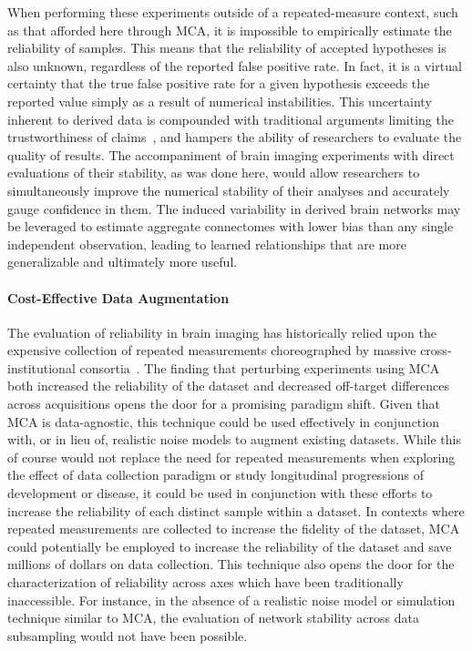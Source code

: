 \documentclass[fleqn,10pt]{SelfArx} %
\begin{document}
When performing these experiments outside of a repeated-measure context, such as that afforded here through MCA, it is
impossible to empirically estimate the reliability of samples. This means that the reliability of accepted hypotheses
is also unknown, regardless of the reported false positive rate. In fact, it is a virtual certainty that the true false
positive rate for a given hypothesis exceeds the reported value simply as a result of numerical instabilities. This
uncertainty inherent to derived data is compounded with traditional arguments limiting the trustworthiness of
claims~\cite{ioannidis2005most}, and hampers the ability of researchers to evaluate the quality of results. The
accompaniment of brain imaging experiments with direct evaluations of their stability, as was done here, would allow
researchers to simultaneously improve the numerical stability of their analyses and accurately gauge confidence in
them. The induced variability in derived brain networks may be leveraged to estimate aggregate connectomes with lower
bias than any single independent observation, leading to learned relationships that are more generalizable and
ultimately more useful.

\paragraph{Cost-Effective Data Augmentation}
The evaluation of reliability in brain imaging has historically relied upon the expensive collection of repeated
measurements choreographed by massive cross-institutional consortia~\cite{van2013wu,zuo2014open}. The finding that
perturbing experiments using MCA both increased the reliability of the dataset and decreased off-target differences
across acquisitions opens the door for a promising paradigm shift. Given that MCA is data-agnostic, this technique
could be used effectively in conjunction with, or in lieu of, realistic noise models to augment existing datasets.
While this of course would not replace the need for repeated measurements when exploring the effect of data collection
paradigm or study longitudinal progressions of development or disease, it could be used in conjunction with these
efforts to increase the reliability of each distinct sample within a dataset. In contexts where repeated measurements
are collected to increase the fidelity of the dataset, MCA could potentially be employed to increase the reliability of
the dataset and save millions of dollars on data collection. This technique also opens the door for the
characterization of reliability across axes which have been traditionally inaccessible. For instance, in the absence of
a realistic noise model or simulation technique similar to MCA, the evaluation of network stability across data
subsampling would not have been possible.
\end{document}
